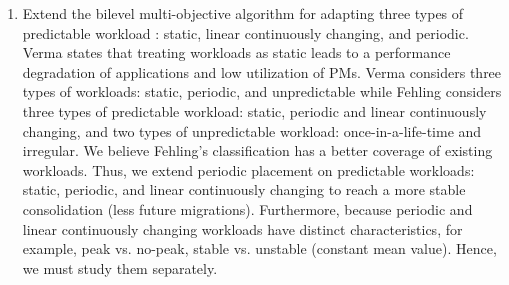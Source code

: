 \begin{enumerate}




	\item Extend the bilevel multi-objective algorithm for adapting three types of predictable workload \cite{Fehling:2014tl}: static, linear continuously changing, and periodic. \\
	
	 Verma states that treating workloads as static leads to a performance degradation of applications and low utilization of PMs. Verma \cite{Verma:2009wi} considers three types of workloads: static, periodic, and unpredictable while Fehling \cite{Fehling:2014tl} considers three types of predictable workload: static, periodic and linear continuously changing, and two types of unpredictable workload: once-in-a-life-time and irregular. We believe Fehling's classification has a better coverage of existing workloads. Thus, we extend periodic placement on predictable workloads: static, periodic, and linear continuously changing to reach a more stable consolidation (less future migrations). Furthermore, because periodic and linear continuously changing workloads have distinct characteristics, for example, peak vs. no-peak, stable vs. unstable (constant mean value). Hence, we must study them separately.


\end{enumerate}
